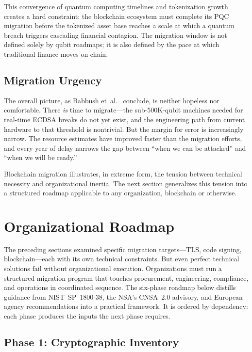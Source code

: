 This convergence of quantum computing timelines and tokenization growth creates a hard constraint: the blockchain ecosystem must complete its PQC migration before the tokenized asset base reaches a scale at which a quantum breach triggers cascading financial contagion.  The migration window is not defined solely by qubit roadmaps; it is also defined by the pace at which traditional finance moves on-chain.

\subsection{Migration Urgency}
\label{subsec:blockchain-urgency}

The overall picture, as Babbush et~al.~\cite{BabbushZalcmanGidney2026} conclude, is neither hopeless nor comfortable.  There \emph{is} time to migrate---the sub-500K-qubit machines needed for real-time ECDSA breaks do not yet exist, and the engineering path from current hardware to that threshold is nontrivial.  But the margin for error is increasingly narrow.  The resource estimates have improved faster than the migration efforts, and every year of delay narrows the gap between ``when we can be attacked'' and ``when we will be ready.''

Blockchain migration illustrates, in extreme form, the tension between technical necessity and organizational inertia.  The next section generalizes this tension into a structured roadmap applicable to any organization, blockchain or otherwise.


\section{Organizational Roadmap}
\label{sec:roadmap}

The preceding sections examined specific migration targets---TLS, code signing, blockchain---each with its own technical constraints.  But even perfect technical solutions fail without organizational execution.  Organizations must run a structured migration program that touches procurement, engineering, compliance, and operations in coordinated sequence.  The six-phase roadmap below distills guidance from NIST~SP~1800-38, the NSA's CNSA~2.0 advisory, and European agency recommendations into a practical framework.  It is ordered by dependency: each phase produces the inputs the next phase requires.

\subsection{Phase 1: Cryptographic Inventory}
\label{subsec:phase-inventory}

